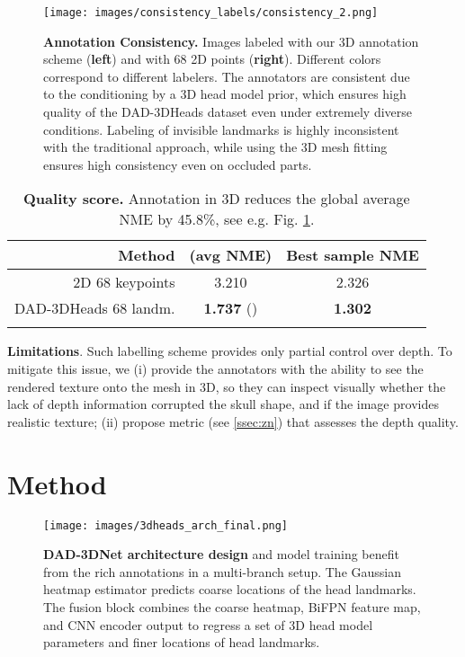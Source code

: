 \documentclass[10pt,twocolumn,letterpaper]{article}
\begin{document}
\begin{figure}[t]\centering
\texttt{[image: images/consistency\_labels/consistency\_2.png]}

  \caption{\textbf{Annotation Consistency.} Images labeled with our 3D annotation scheme (\textbf{left}) and with 68 2D points (\textbf{right}). Different colors correspond to different labelers. The annotators are consistent due to the conditioning by a 3D head model prior,
which ensures high quality of the DAD-3DHeads dataset even under extremely diverse conditions. Labeling of invisible landmarks is highly inconsistent with the traditional approach, while using the 3D mesh fitting ensures high consistency even on occluded parts.
}
  \vspace{-1em}
  \label{fig:labeling_consistency}
\end{figure}

\begin{table}[t]
\footnotesize
\renewcommand{\arraystretch}{0.95}
\centering
\begin{tabular}{r|c|c}
\noalign{\smallskip}
Method &  (avg NME) & Best sample NME\\
\hline
2D 68 keypoints & 3.210 & 2.326\\
DAD-3DHeads 68 landm. & \textbf{1.737} \textcolor{ao(english)}{()} &  \textbf{1.302} \\
\noalign{\smallskip}
\end{tabular}
\caption{\textbf{Quality score.} Annotation in 3D reduces  the global average NME by 45.8\%, see e.g. Fig. \ref{fig:labeling_consistency}.
}
\label{t:consistency_matrix}
\end{table} 
\textbf{Limitations}. Such labelling scheme provides only partial control over depth. To mitigate this issue, we (i) provide the annotators with the ability to see the rendered texture onto the mesh in 3D, so they can inspect visually whether the lack of depth information corrupted the skull shape, and if the image provides realistic texture; (ii) propose  metric (see \cref{ssec:zn}) that assesses the depth quality. \section{Method}

\begin{figure*}[t!]\centering

  \texttt{[image: images/3dheads\_arch\_final.png]}
  \vspace{-1em}
  \caption{\textbf{DAD-3DNet architecture design} and model training benefit from the rich annotations in a multi-branch setup. The Gaussian heatmap estimator predicts coarse locations of the head landmarks. The fusion block combines the coarse heatmap, BiFPN feature map, and CNN encoder output to regress a set of 3D head model parameters and finer locations of head landmarks.}
\label{fig:arch}
\end{figure*}
\end{document}
